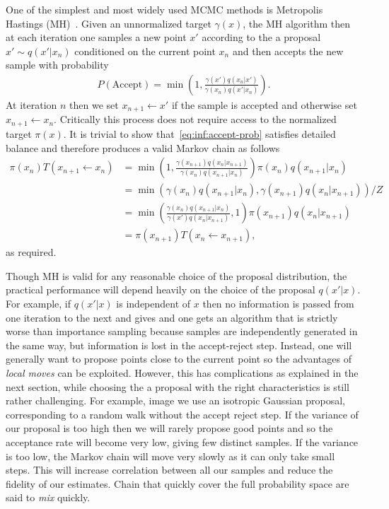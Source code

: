 One of the simplest and most widely used MCMC methods is Metropolis Hastings (MH)~\cite{hastings1970monte}.
Given an unnormalized target $\gamma(x)$, the MH algorithm then at each iteration one samples 
a new point $x'$ according to the a proposal $x' \sim q(x' | x_n)$ conditioned on the current point $x_n$ 
and then accepts the new sample with probability
\begin{align}
\label{eq:inf:accept-prob}
P(\text{Accept}) = \min \left(1, \frac{\gamma(x') q(x_n | x')}{\gamma(x_n) q(x' | x_n)}\right).
\end{align}
At iteration $n$ then we set $x_{n+1} \leftarrow x'$ if the sample is accepted and otherwise
set $x_{n+1} \leftarrow x_{n}$.  Critically this process does not require access to the normalized
target $\pi(x)$.  It is trivial to show that~\eqref{eq:inf:accept-prob} satisfies detailed
balance and therefore produces a valid Markov chain as follows
\begin{align*}
\pi(x_n) T(x_{n+1} \leftarrow x_n) &= \min \left(1, \frac{\gamma(x_{n+1}) q(x_n | x_{n+1})}{\gamma(x_n) q(x_{n+1} | x_n)}\right)
\pi(x_n) q(x_{n+1} | x_n) \\
&= \min \left(\gamma(x_n) q(x_{n+1} | x_n),\gamma(x_{n+1}) q(x_n | x_{n+1})\right) / Z \\
&= \min \left(\frac{\gamma(x_n) q(x_{n+1} | x_n)}{\gamma(x') q(x_n | x_{n+1})},1\right) \pi(x_{n+1}) q(x_n | x_{n+1}) \\
&=\pi(x_{n+1}) T(x_n \leftarrow x_{n+1}),
\end{align*}
as required.

Though MH is valid for any reasonable choice of the proposal distribution,
the practical performance will depend heavily on the choice of the proposal $q(x'|x)$.
For example, if $q(x'|x)$ is independent of $x$ then no information is passed from one iteration
to the next and gives and one gets an algorithm that is strictly worse than importance sampling
because samples are independently generated in the same way, but information is lost in the accept-reject
step.  Instead, one will generally want to propose points close to the current point so the advantages
of \emph{local moves} can be exploited.  However, this has complications as explained in the next
section, while choosing the a proposal with the right characteristics is still rather challenging.
For example, image we use an isotropic Gaussian proposal, corresponding to a random walk without the
accept reject step.  If the variance of our proposal is too high then we will rarely propose good points
and so the acceptance rate will become very low, giving few distinct samples.  If the variance is too low,
the Markov chain will move very slowly as it can only take small steps.  This will increase correlation
between all our samples and reduce the fidelity of our estimates.  Chain that quickly cover the full
probability space are said to \emph{mix} quickly.

